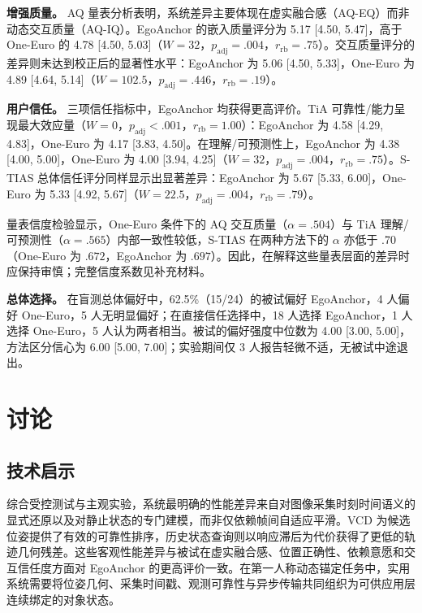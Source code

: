 \documentclass[review]{vgtc}
\begin{document}
\textbf{增强质量。}
AQ 量表分析表明，系统差异主要体现在虚实融合感（AQ-EQ）而非动态交互质量（AQ-IQ）。EgoAnchor 的嵌入质量评分为 5.17 [4.50, 5.47]，高于 One-Euro 的 4.78 [4.50, 5.03]（$W=32$，$p_{\mathrm{adj}}=.004$，$r_{\mathrm{rb}}=.75$）。交互质量评分的差异则未达到校正后的显著性水平：EgoAnchor 为 5.06 [4.50, 5.33]，One-Euro 为 4.89 [4.64, 5.14]（$W=102.5$，$p_{\mathrm{adj}}=.446$，$r_{\mathrm{rb}}=.19$）。

\textbf{用户信任。}
三项信任指标中，EgoAnchor 均获得更高评价。TiA 可靠性/能力呈现最大效应量（$W=0$，$p_{\mathrm{adj}}<.001$，$r_{\mathrm{rb}}=1.00$）：EgoAnchor 为 4.58 [4.29, 4.83]，One-Euro 为 4.17 [3.83, 4.50]。在理解/可预测性上，EgoAnchor 为 4.38 [4.00, 5.00]，One-Euro 为 4.00 [3.94, 4.25]（$W=32$，$p_{\mathrm{adj}}=.004$，$r_{\mathrm{rb}}=.75$）。S-TIAS 总体信任评分同样显示出显著差异：EgoAnchor 为 5.67 [5.33, 6.00]，One-Euro 为 5.33 [4.92, 5.67]（$W=22.5$，$p_{\mathrm{adj}}=.004$，$r_{\mathrm{rb}}=.79$）。

量表信度检验显示，One-Euro 条件下的 AQ 交互质量（$\alpha=.504$）与 TiA 理解/可预测性（$\alpha=.565$）内部一致性较低，S-TIAS 在两种方法下的 $\alpha$ 亦低于 .70（One-Euro 为 $.672$，EgoAnchor 为 $.697$）。因此，在解释这些量表层面的差异时应保持审慎；完整信度系数见补充材料。

\textbf{总体选择。}
在盲测总体偏好中，62.5\%（15/24）的被试偏好 EgoAnchor，4 人偏好 One-Euro，5 人无明显偏好；在直接信任选择中，18 人选择 EgoAnchor，1 人选择 One-Euro，5 人认为两者相当。被试的偏好强度中位数为 4.00 [3.00, 5.00]，方法区分信心为 6.00 [5.00, 7.00]；实验期间仅 3 人报告轻微不适，无被试中途退出。

\section{讨论}\label{sec:discussion}

\subsection{技术启示}

综合受控测试与主观实验，系统最明确的性能差异来自对图像采集时刻时间语义的显式还原以及对静止状态的专门建模，而非仅依赖帧间自适应平滑。VCD 为候选位姿提供了有效的可靠性排序，历史状态查询则以响应滞后为代价获得了更低的轨迹几何残差。这些客观性能差异与被试在虚实融合感、位置正确性、依赖意愿和交互信任度方面对 EgoAnchor 的更高评价一致。在第一人称动态锚定任务中，实用系统需要将位姿几何、采集时间戳、观测可靠性与异步传输共同组织为可供应用层连续绑定的对象状态。
\end{document}
